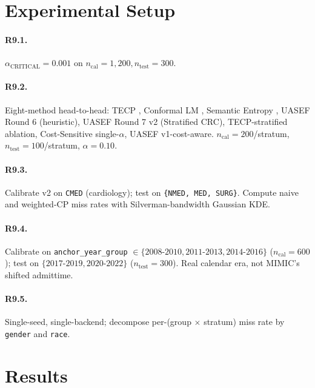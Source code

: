 \documentclass[11pt,letterpaper]{article}
\begin{document}
\section{Experimental Setup}

\paragraph{R9.1.} $\alpha_{\text{CRITICAL}} = 0.001$ on
$n_{\text{cal}} = 1{,}200, n_{\text{test}} = 300$.

\paragraph{R9.2.} Eight-method head-to-head: TECP \cite{XuLuTECP2025},
Conformal LM \cite{Quach2024CLM}, Semantic Entropy \cite{Farquhar2024SE},
UASEF Round 6 (heuristic), UASEF Round 7 v2 (Stratified CRC), TECP-stratified
ablation, Cost-Sensitive single-$\alpha$, UASEF v1-cost-aware. $n_{\text{cal}}
= 200$/stratum, $n_{\text{test}} = 100$/stratum, $\alpha = 0.10$.

\paragraph{R9.3.} Calibrate v2 on \texttt{CMED} (cardiology); test on
\texttt{\{NMED, MED, SURG\}}. Compute naive and weighted-CP
\cite{Tibshirani2019} miss rates with Silverman-bandwidth Gaussian KDE.

\paragraph{R9.4.} Calibrate on
\texttt{anchor\_year\_group} $\in \{\text{2008-2010}, \text{2011-2013},
\text{2014-2016}\}$ ($n_{\text{cal}} = 600$); test on $\{\text{2017-2019},
\text{2020-2022}\}$ ($n_{\text{test}} = 300$). Real calendar era, not
MIMIC's shifted admittime.

\paragraph{R9.5.} Single-seed, single-backend; decompose per-(group $\times$
stratum) miss rate by \texttt{gender} and \texttt{race}.

\section{Results}
\end{document}
